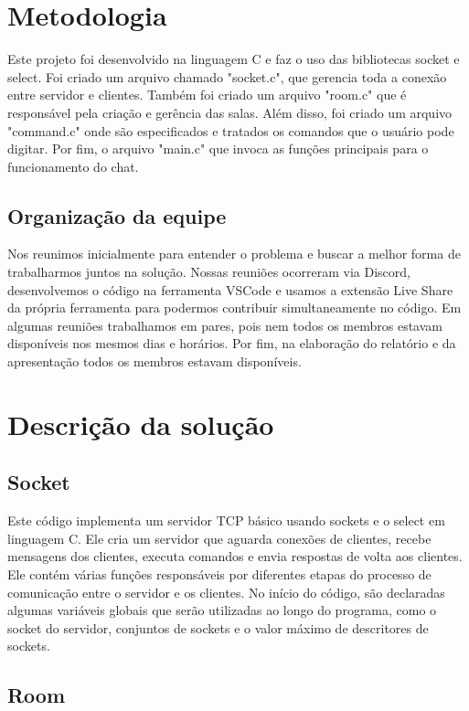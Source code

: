 \documentclass[a4paper]{article}
\begin{document}
\section{Metodologia}

Este projeto foi desenvolvido na linguagem C e faz o uso das bibliotecas socket e select. Foi criado um arquivo chamado "socket.c", que gerencia toda a conexão entre servidor e clientes. Também foi criado um arquivo "room.c" que é responsável pela criação e gerência das salas. Além disso, foi criado um arquivo "command.c" onde são especificados e tratados os comandos que o usuário pode digitar. Por fim, o arquivo "main.c" que invoca as funções principais para o funcionamento do chat.

\subsection{Organização da equipe}

Nos reunimos inicialmente para entender o problema e
buscar a melhor forma de trabalharmos juntos na solução. Nossas reuniões ocorreram via Discord, desenvolvemos o código na ferramenta VSCode e usamos a extensão Live Share da própria ferramenta para podermos contribuir simultaneamente no código. Em algumas reuniões trabalhamos em pares, pois nem todos os membros estavam disponíveis nos mesmos dias e horários. Por fim, na elaboração do relatório e da apresentação todos os membros estavam disponíveis.

\section{Descrição da solução}
\subsection{Socket}

Este código implementa um servidor TCP básico usando sockets e o select em linguagem C. Ele cria um servidor que aguarda conexões de clientes, recebe mensagens dos clientes, executa comandos e envia respostas de volta aos clientes. Ele contém várias funções responsáveis por diferentes etapas do processo de comunicação entre o servidor e os clientes. No início do código, são declaradas algumas variáveis globais que serão utilizadas ao longo do programa, como o socket do servidor, conjuntos de sockets e o valor máximo de descritores de sockets.

\subsection{Room}
\end{document}
